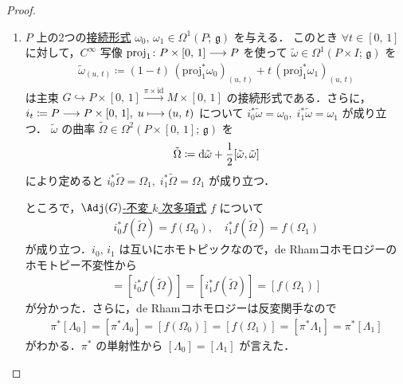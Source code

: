 \documentclass[TQFT_main]{subfiles}
\begin{document}
\begin{proof}
\begin{enumerate}
        \item $P$ 上の2つの\hyperref[def:connection]{接続形式} $\omega_0,\, \omega_1 \in \Omega^1(P;\, \mathfrak{g})$ を与える．
        このとき $\forall t \in [0,\, 1]$ に対して，$C^\infty$ 写像 $\mathrm{proj}_1 \colon P \times [0,\, 1] \longrightarrow P$ を使って $\tilde{\omega} \in  \Omega^1(P\times I;\, \mathfrak{g})$ を
        \begin{align}
            \tilde{\omega}_{(u,\, t)} \coloneqq (1-t)\, (\mathrm{proj}_1^* \omega_0)_{(u,\, t)} + t\, (\mathrm{proj}_1^* \omega_1)_{(u,\, t)}
        \end{align}
        は主束 $G \hookrightarrow P \times [0,\, 1] \xrightarrow{\pi \times \mathrm{id}} M \times [0,\, 1]$ の接続形式である．さらに，$i_t \coloneqq P \longrightarrow P \times [0,\, 1],\; u \longmapsto (u,\, t)$ について
        $i_0^* \tilde{\omega} = \omega_0,\; i_1^* \tilde{\omega} = \omega_1$ が成り立つ．
        $\tilde{\omega}$ の曲率 $\tilde{\Omega} \in \Omega^2(P\times [0,\, 1];\, \mathfrak{g})$ を
        \begin{align}
            \tilde{\Omega} \coloneqq \dd{\tilde{\omega}} + \frac{1}{2} \comm{\tilde{\omega}}{\tilde{\omega}}
        \end{align}
        により定めると $i_0^* \tilde{\Omega} = \Omega_1,\;  i_1^* \tilde{\Omega} = \Omega_1$ が成り立つ．
        
        ところで，\hyperref[def:invariant]{$\Adj(G)$-不変 $k$ 次多項式} $f$ について
        \begin{align}
            i_0^* f(\tilde{\Omega}) = f(\Omega_0),\quad i_1^* f(\tilde{\Omega}) = f(\Omega_1)
        \end{align}
        が成り立つ．$i_0,\, i_1$ は互いにホモトピックなので，de Rhamコホモロジーのホモトピー不変性から
        \begin{align}
            [f(\Omega_0)] = [i_0^* f(\tilde{\Omega})] = [i_1^* f(\tilde{\Omega})] = [f(\Omega_1)]
        \end{align}
        が分かった．さらに，de Rhamコホモロジーは反変関手なので
        \begin{align}
            \pi^* [\Lambda_0] = [\pi^* \Lambda_0] = [f(\Omega_0)] = [f(\Omega_1)] = [\pi^* \Lambda_1] = \pi^* [\Lambda_1]
        \end{align}
        がわかる．$\pi^*$ の単射性から $[\Lambda_0] = [\Lambda_1]$ が言えた．
    \end{enumerate}

\end{proof}
\end{document}
